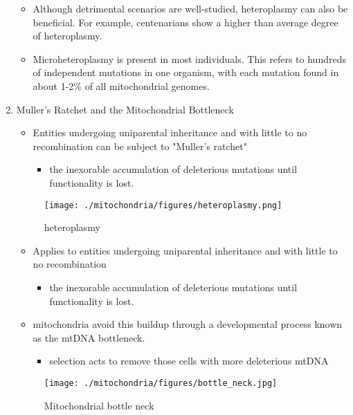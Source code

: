 \documentclass{scrartcl}
\begin{document}
\begin{enumerate}
\begin{itemize}
\item Although detrimental scenarios are well-studied, heteroplasmy can
also be beneficial. For example, centenarians show a higher than
average degree of heteroplasmy.

\item Microheteroplasmy is present in most individuals. This refers to
hundreds of independent mutations in one organism, with each
mutation found in about 1-2\% of all mitochondrial genomes.
\end{itemize}

\item Muller's Ratchet and the Mitochondrial Bottleneck
\label{sec:org437ef63}

\begin{itemize}
\item Entities undergoing uniparental inheritance and with little to no
recombination can be subject to "Muller's ratchet"
\begin{itemize}
\item the inexorable accumulation of deleterious mutations until
functionality is lost.
\end{itemize}
\end{itemize}

\begin{figure}[htbp]
\centering
\texttt{[image: ./mitochondria/figures/heteroplasmy.png]}
\caption[heter]{\label{fig:org2595d78}
heteroplasmy}
\end{figure}


\begin{itemize}
\item Applies to entities undergoing uniparental inheritance and with little to no
recombination
\begin{itemize}
\item the inexorable accumulation of deleterious mutations until functionality
is lost.
\end{itemize}

\item mitochondria avoid this buildup through a developmental process
known as the mtDNA bottleneck. 
\begin{itemize}
\item selection acts to remove those cells with more deleterious mtDNA
\end{itemize}
\end{itemize}

\begin{figure}[htbp]
\centering
\texttt{[image: ./mitochondria/figures/bottle\_neck.jpg]}
\caption[bottle]{\label{fig:org521b6eb}
Mitochondrial bottle neck}
\end{figure}


\end{enumerate}
\end{document}
